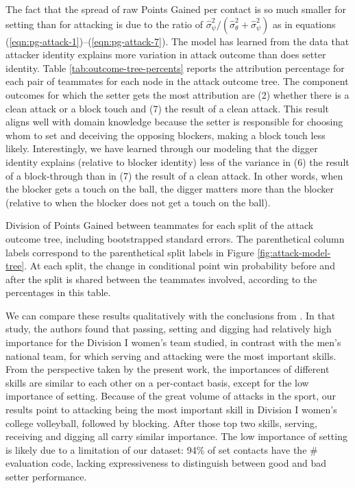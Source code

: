 \documentclass[USenglish]{article}
\theoremstyle{dgthm}
\theoremstyle{dgdef}
\begin{document}
The fact that the spread of raw Points Gained per contact is so much smaller for setting than for attacking is due to the ratio of $\hat\sigma^2_\psi / (\hat\sigma^2_\theta + \hat\sigma^2_\psi)$ as in equations (\ref{eqn:pg-attack-1})--(\ref{eqn:pg-attack-7}). The model has learned from the data that attacker identity explains more variation in attack outcome than does setter identity. Table \ref{tab:outcome-tree-percents} reports the attribution percentage for each pair of teammates for each node in the attack outcome tree. The component outcomes for which the setter gets the most attribution are (2) whether there is a clean attack or a block touch and (7) the result of a clean attack. This result aligns well with domain knowledge because the setter is responsible for choosing whom to set and deceiving the opposing blockers, making a block touch less likely. Interestingly, we have learned through our modeling that the digger identity explains (relative to blocker identity) less of the variance in (6) the result of a block-through than in (7) the result of a clean attack. In other words, when the blocker gets a touch on the ball, the digger matters more than the blocker (relative to when the blocker does not get a touch on the ball).

\begin{table}
    \centering
    
    \caption{Division of Points Gained between teammates for each split of the attack outcome tree, including bootstrapped standard errors. The parenthetical column labels correspond to the parenthetical split labels in Figure \ref{fig:attack-model-tree}. At each split, the change in conditional point win probability before and after the split is shared between the teammates involved, according to the percentages in this table.}
    \label{tab:outcome-tree-percents}
\end{table}

  We can compare these results qualitatively with the conclusions from \textcite{miskin_etal_2010}. In that study, the authors found that passing, setting and digging had relatively high importance for the Division I women's team studied, in contrast with the men's national team, for which serving and attacking were the most important skills. From the perspective taken by the present work, the importances of different skills are similar to each other on a per-contact basis, except for the low importance of setting. Because of the great volume of attacks in the sport, our results point to attacking being the most important skill in Division I women's college volleyball, followed by blocking. After those top two skills, serving, receiving and digging all carry similar importance. The low importance of setting is likely due to a limitation of our dataset: 94\% of set contacts have the \# evaluation code, lacking expressiveness to distinguish between good and bad setter performance.
\end{document}
